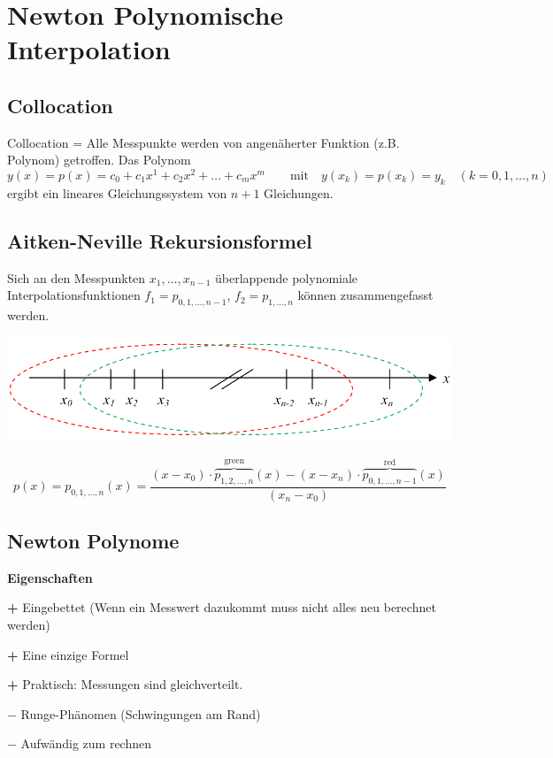 
\section{Newton Polynomische Interpolation}
\subsection{Collocation}
Collocation = Alle Messpunkte werden von angenäherter Funktion (z.B. Polynom) getroffen.
Das Polynom 
\[y(x) = p(x) = c_0 + c_1x^1 + c_2x^2 + \ldots + c_mx^m \qquad \text{mit} \quad y(x_k)=p(x_k)=y_k \quad (k=0,1,\ldots,n) \]
ergibt ein lineares Gleichungssystem von $n+1$ Gleichungen.


\subsection{Aitken-Neville Rekursionsformel}
Sich an den Messpunkten $x_1,\ldots, x_{n-1}$ überlappende polynomiale Interpolationsfunktionen 
$f_1=p_{0,1,\ldots,n-1}$, $f_2=p_{1,\ldots,n}$ können zusammengefasst werden. 

\begin{minipage}{8cm}
\includegraphics[width=\textwidth]{bilder/aitkenNevilleIdee}
\end{minipage}
\hfill
\begin{minipage}{11cm}
    \[
        p(x) = p_{0,1,\ldots,n}(x) = \frac{(x-x_0) \cdot \overbrace{p_{1,2,\ldots,n}}^{\text{green}}(x) - (x-x_n) \cdot \overbrace{p_{0,1,\ldots,n-1}}^{\text{red}}(x)}{(x_n - x_0)}
    \]
\end{minipage}

\subsection{Newton Polynome}
\textbf{Eigenschaften}
\begin{liste}
	\item[\textbf{+}] Eingebettet (Wenn ein Messwert dazukommt muss nicht alles neu berechnet werden)
	\item[\textbf{+}] Eine einzige Formel
	\item[\textbf{+}] Praktisch: Messungen sind gleichverteilt.
	\item[$\mathbf{-}$] Runge-Phänomen (Schwingungen am Rand)
	\item[$\mathbf{-}$] Aufwändig zum rechnen
\end{liste}


